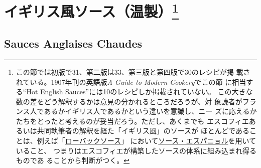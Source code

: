 \hypertarget{ux30a4ux30aeux30eaux30b9ux98a8ux30bdux30fcux30b9ux6e29ux88fd24}{%
\section[イギリス風ソース（温製）]{\texorpdfstring{イギリス風ソース（温製）\footnote{この節では初版で31、第二版は33、第三版と第四版で30のレシピが掲
  載されている。1907年刊の英語版\emph{A Guide to Modern Cookery}でこの節
  に相当する``Hot English Sauces''には10のレシピしか掲載されていない。
  この大きな数の差をどう解釈するかは意見の分かれるところだろうが、対
  象読者がフランス人であるかイギリス人であるかという違いを意識し、ニー
  ズに応えるかたちをとったと考えるのが妥当だろう。ただし、あくまでも
  エスコフィエあるいは共同執筆者の解釈を経た「イギリス風」のソースが
  ほとんどであることは、例えば「\protect\hyperlink{roe-buck-sauce}{ローバックソース}」
  において\protect\hyperlink{sauce-espagnole}{ソース・エスパニョル}を用いていること、
  つまりはエスコフィエが構築したソースの体系に組み込まれ得るものであ
  ることから判断がつく。}}{イギリス風ソース（温製）}}\label{ux30a4ux30aeux30eaux30b9ux98a8ux30bdux30fcux30b9ux6e29ux88fd24}}

\hypertarget{sauces-anglaises-chaudes}{%
\subsection{Sauces Anglaises Chaudes}\label{sauces-anglaises-chaudes}}


